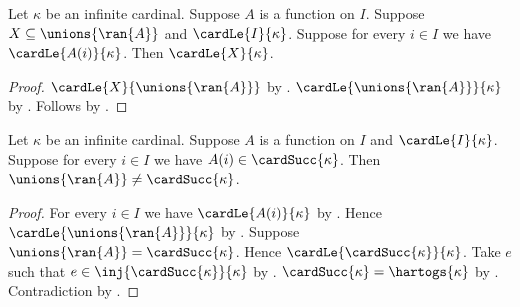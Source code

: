 \begin{corollary}\label{indexed_cover_infinite_cardinal_bound}
    Let $\kappa$ be an infinite cardinal.
    Suppose $A$ is a function on $I$.
    Suppose $X\subseteq\unions{\ran{A}}$ and
        $\cardLe{I}{\kappa}$.
    Suppose for every $i\in I$ we have $\cardLe{A(i)}{\kappa}$.
    Then $\cardLe{X}{\kappa}$.
\end{corollary}
\begin{proof}
    $\cardLe{X}{\unions{\ran{A}}}$
        by .
    $\cardLe{\unions{\ran{A}}}{\kappa}$
        by .
    Follows by .
\end{proof}

\begin{theorem}\label{no_small_indexed_cover_of_cardinal_successor}
    Let $\kappa$ be an infinite cardinal.
    Suppose $A$ is a function on $I$ and $\cardLe{I}{\kappa}$.
    Suppose for every $i\in I$ we have $A(i)\in\cardSucc{\kappa}$.
    Then $\unions{\ran{A}}\neq\cardSucc{\kappa}$.
\end{theorem}
\begin{proof}
    For every $i\in I$ we have $\cardLe{A(i)}{\kappa}$
        by .
    Hence $\cardLe{\unions{\ran{A}}}{\kappa}$
        by .
    Suppose $\unions{\ran{A}}=\cardSucc{\kappa}$.
    Hence $\cardLe{\cardSucc{\kappa}}{\kappa}$.
    Take $e$ such that $e\in\inj{\cardSucc{\kappa}}{\kappa}$
        by .
    $\cardSucc{\kappa}=\hartogs{\kappa}$
        by .
    Contradiction by .
\end{proof}

